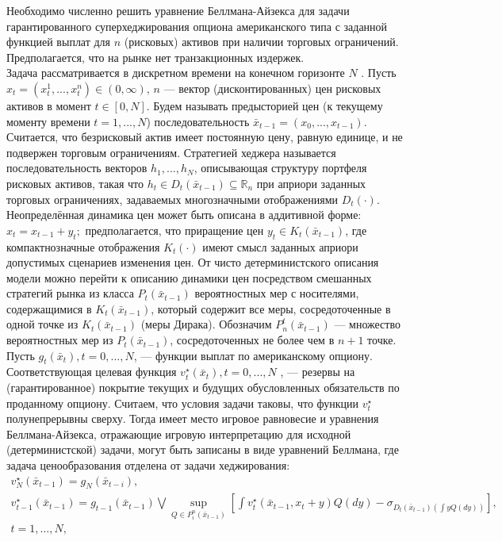 \documentclass{article}
\begin{document}
Необходимо численно решить уравнение Беллмана-Айзекса для задачи гарантированного суперхеджирования опциона американского типа с заданной функцией выплат
для $n$ (рисковых) активов при наличии торговых ограничений. Предполагается, что на
рынке нет транзакционных издержек.
\\
Задача рассматривается в дискретном времени на конечном горизонте $N$ . Пусть
$x_t = (x^1_t , . . . , x^n_t ) \in (0, \infty), \, n$ --- вектор (дисконтированных) цен рисковых активов в
момент $t \in [0, N]$. Будем называть предысторией цен (к текущему моменту времени
$t = 1, . . . , N $) последовательность $\bar{x}_{t-1} = (x_0 , . . . , x_{t-1} )$. Считается, что безрисковый актив имеет постоянную цену, равную единице, и не подвержен торговым ограничениям. Стратегией хеджера называется последовательность векторов $h_1 , . . . , h_N$, описывающая структуру портфеля рисковых активов, такая что $h_t \in D_t (\bar{x}_{t-1} ) \subseteq \mathbb{R}_n$ при априори заданных торговых ограничениях, задаваемых многозначными отображениями $D_t (·)$. \\
Неопределённая динамика цен может быть описана в аддитивной форме: $x_t = x_{t-1} + y_t;$ предполагается, что приращение цен $y_t \in K_t (\bar{x}_{t-1} )$, где компактнозначные отображения $K_t (·)$ имеют смысл заданных априори допустимых сценариев изменения
цен. От чисто детерминистского описания модели можно перейти к описанию динамики цен посредством смешанных стратегий рынка из класса $P_t (\bar{x}_{t-1} )$ вероятностных
мер с носителями, содержащимися в $K_t (\bar{x}_{t-1} )$, который содержит все меры, сосредоточенные в одной точке из $K_t (\bar{x}_{t-1} )$ (меры Дирака). Обозначим $P^t_n (\bar{x}_{t-1} )$ — множество вероятностных мер из $P_t (\bar{x}_{t-1} )$, сосредоточенных не более чем в $n + 1$ точке.
 \\
Пусть $g_t (\bar{x}_t ), t = 0, . . . , N $, --- функции выплат по американскому опциону. Соответствующая целевая функция $v_t^{\star} (\bar{x}_t ), t = 0, . . . , N$ , --- резервы на (гарантированное)
покрытие текущих и будущих обусловленных обязательств по проданному опциону.
Считаем, что условия задачи таковы, что функции $v_t^{\star}$ полунепрерывны сверху. Тогда
имеет место игровое равновесие и уравнения Беллмана-Айзекса, отражающие игровую
интерпретацию для исходной (детерминистской) задачи, могут быть записаны в виде уравнений Беллмана, где задача ценообразования отделена от задачи хеджирования:
\begin{equation}\label{bellman}
	\begin{array}{c}
		v^{\star}_N(\bar{x}_{t-1}) = g_N(\bar{x}_{t-i}),\\
		v^{\star}_{t-1} \left( \bar{x}_{t-1} \right) = g_{t-1}(\bar{x}_{t-1}) \bigvee \underset{ Q \in P_i^n (\bar{x}_{t-1} )}{ \sup } \left[ \int v^{\star}_t \left( \bar{x}_{t-1}, x_{t} + y\right) Q(dy) - \sigma _{D_t(\bar{x}_{t-1}) \left( \int y Q(dy)\right) }\right], \\
		t = 1, \dots, N,		
	\end{array}
\end{equation}
\end{document}
